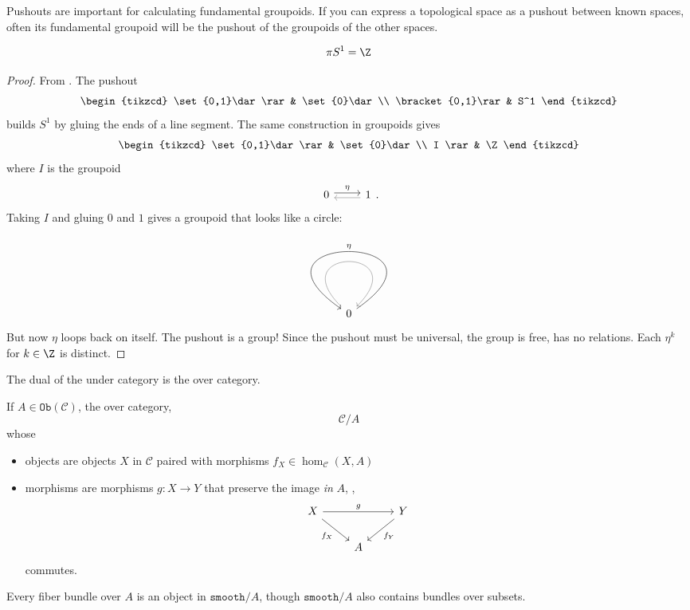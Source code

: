 \documentclass[a5paper]{scrartcl}
\def\cat{\mathcal{C}}
\def\smooth{\texttt{smooth}}
\newcommand{\obj}{\texttt{Ob}}
\DeclareMathOperator*{\Hom}{hom}
\def\hom{\Hom}
\begin{document}
Pushouts are important for calculating fundamental groupoids. If you can express a topological space as a pushout between known spaces, often its fundamental groupoid will be the pushout of the groupoids of the other spaces\cite[xxi]{groupoid}.
\begin{theorem}
  \[
    \pi S^1 = \Z
  \]
\end{theorem}
\begin{proof} From \cite[xxi]{groupoid}.
  The pushout
  \[
    \begin{tikzcd}
      \set{0,1}\dar\rar& \set{0}\dar \\
      \bracket{0,1}\rar& S^1
    \end{tikzcd}
  \]
  builds \(S^1\) by gluing the ends of a line segment. The same construction in groupoids gives
  \[
    \begin{tikzcd}
      \set{0,1}\dar\rar& \set{0}\dar \\
      I \rar& \Z
    \end{tikzcd}
  \]
  where \(I\) is the groupoid
  \[
    \begin{tikzcd}
      0\rar[shift left = .5ex]{\eta}& 1 \lar[shift left = .5ex,gray]{}
    \end{tikzcd}.
  \]
  Taking \(I\) and gluing \(0\) and \(1\) gives a groupoid that looks like a circle:
  \[
    \begin{tikzcd}
      0  \ar[swap,loop,"\eta", in=145,out=35, looseness=22]{}
       \ar[<- ,gray,swap,loop,looseness=14]{}
    \end{tikzcd}
  \]
  But now \(\eta\) loops back on itself. The pushout is a group! Since the pushout must be universal, the group is free, has no relations. Each \(\eta^k\) for \(k\in\Z\) is distinct.
\end{proof}

The dual of the under category is the over category.
\begin{defn}
  If \(A\in\obj(\cat)\), the over category,
  \[
     \cat/ A
  \]
  whose
  \begin{itemize}
    \item objects are objects \(X\) in \(\cat\) paired with morphisms \(f_X\in\hom_\cat(X , A)\)
    \item morphisms are morphisms \(g: X \to Y\) that preserve the image \emph{in} \(A\), \ie,
          \[
          \begin{tikzcd}
            X\ar[swap,"f_X"]{dr} \ar["g"]{rr} && Y\ar["f_Y"]{dl} \\
            &A
          \end{tikzcd}
          \]
          commutes.
  \end{itemize}
\end{defn}
Every fiber bundle over \(A\) is an object in \(\smooth/A\), though \(\smooth/A\) also contains bundles over subsets.
\end{document}
